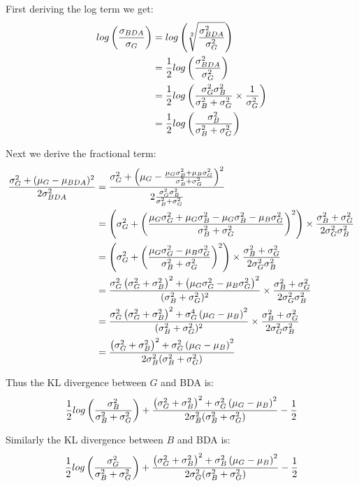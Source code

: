 First deriving the log term we get:
\begin{align}
	log\left(\frac{\sigma_{BDA}}{\sigma_{G}}\right)
	&= log\left(\sqrt[2]{\frac{\sigma_{BDA}^2}{\sigma_{G}^2}}\right)\\
	&= \frac{1}{2} log\left(\frac{\sigma_{BDA}^2}{\sigma_{G}^2}\right)\\
	&= \frac{1}{2} log\left(\frac{\sigma_G^2 \sigma_B^2}{\sigma_B^2 + \sigma_G^2} \times \frac{1}{\sigma_G^2}\right)\\
	&= \frac{1}{2} log\left(\frac{\sigma_B^2}{\sigma_B^2 + \sigma_G^2}\right)
\end{align}

Next we derive the fractional term:
\begin{align}
	\frac{\sigma_{G}^2 + (\mu_{G} - \mu_{BDA})^2}{2\sigma_{BDA}^2}
	&= \frac{
			\sigma_G^2 + \left(\mu_G - \frac{\mu_G\sigma_B^2 + \mu_B\sigma_G^2}{\sigma_B^2 + \sigma_G^2}\right)^2
		}{
			2 \frac{\sigma_G^2 \sigma_B^2}{\sigma_B^2 + \sigma_G^2}
		}\\
	&= \left(\sigma_G^2 + \left(\frac{\mu_G\sigma_G^2 + \mu_G\sigma_B^2 - \mu_G\sigma_B^2 - \mu_B\sigma_G^2}{\sigma_B^2 + \sigma_G^2}\right)^2\right) \times \frac{\sigma_B^2 + \sigma_G^2}{2\sigma_G^2\sigma_B^2}\\
	&= \left(\sigma_G^2 + \left(\frac{\mu_G\sigma_G^2 - \mu_B\sigma_G^2}{\sigma_B^2 + \sigma_G^2}\right)^2\right) \times \frac{\sigma_B^2 + \sigma_G^2}{2\sigma_G^2\sigma_B^2}\\
	&= \frac{\sigma_G^2\left(\sigma_G^2 + \sigma_B^2\right)^2 + \left(\mu_G\sigma_G^2 - \mu_B\sigma_G^2\right)^2}{(\sigma_B^2 + \sigma_G^2)^2} \times \frac{\sigma_B^2 + \sigma_G^2}{2\sigma_G^2\sigma_B^2}\\
	&= \frac{\sigma_G^2\left(\sigma_G^2 + \sigma_B^2\right)^2 + \sigma_G^4\left(\mu_G - \mu_B\right)^2}{(\sigma_B^2 + \sigma_G^2)^2} \times \frac{\sigma_B^2 + \sigma_G^2}{2\sigma_G^2\sigma_B^2}\\
	&= \frac{\left(\sigma_G^2 + \sigma_B^2\right)^2 + \sigma_G^2\left(\mu_G - \mu_B\right)^2}{2\sigma_B^2(\sigma_B^2 + \sigma_G^2)}
\end{align}

Thus the KL divergence between $G$ and BDA is:
\begin{equation}
	\frac{1}{2} log\left(\frac{\sigma_B^2}{\sigma_B^2 + \sigma_G^2}\right) + \frac{\left(\sigma_G^2 + \sigma_B^2\right)^2 + \sigma_G^2\left(\mu_G - \mu_B\right)^2}{2\sigma_B^2(\sigma_B^2 + \sigma_G^2)} - \frac{1}{2}
\end{equation}

Similarly the KL divergence between $B$ and BDA is:
\begin{equation}
	\frac{1}{2} log\left(\frac{\sigma_G^2}{\sigma_B^2 + \sigma_G^2}\right) + \frac{\left(\sigma_G^2 + \sigma_B^2\right)^2 + \sigma_B^2\left(\mu_G - \mu_B\right)^2}{2\sigma_G^2(\sigma_B^2 + \sigma_G^2)} - \frac{1}{2}
\end{equation}

